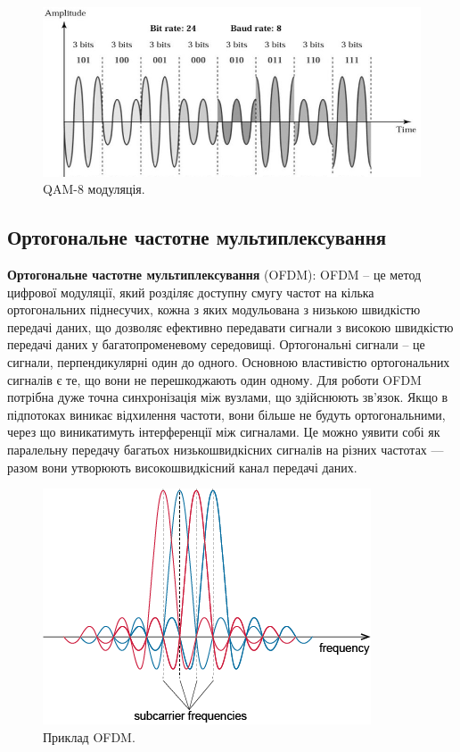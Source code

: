 \documentclass{article}
\begin{document}
\begin{figure}[h!]
	\centering
	\includegraphics[width=0.8\linewidth]{images/qam.png}
	\caption{\label{fig:qam} QAM-8 модуляція.}
\end{figure}


\subsection{Ортогональне частотне мультиплексування}
\textbf{Ортогональне частотне мультиплексування} (OFDM): OFDM – це метод цифрової модуляції, який розділяє доступну смугу частот на кілька ортогональних піднесучих, кожна з яких модульована з низькою швидкістю передачі даних, що дозволяє ефективно передавати сигнали з високою швидкістю передачі даних у багатопроменевому середовищі.
Ортогональні сигнали – це сигнали, перпендикулярні один до одного. Основною властивістю ортогональних сигналів є те, що вони не перешкоджають один одному. Для роботи OFDM потрібна дуже точна синхронізація між вузлами, що здійснюють зв'язок. Якщо в підпотоках виникає відхилення частоти, вони більше не будуть ортогональними, через що виникатимуть інтерференції між сигналами. Це можно уявити собі як паралельну передачу багатьох низькошвидкісних сигналів на різних частотах — разом вони утворюють високошвидкісний канал передачі даних.

\begin{figure}[h!]
	\centering
	\includegraphics[width=0.7\linewidth]{images/ofdm.png}
	\caption{\label{fig:ofdm}  Приклад OFDM.}
\end{figure}
\end{document}
